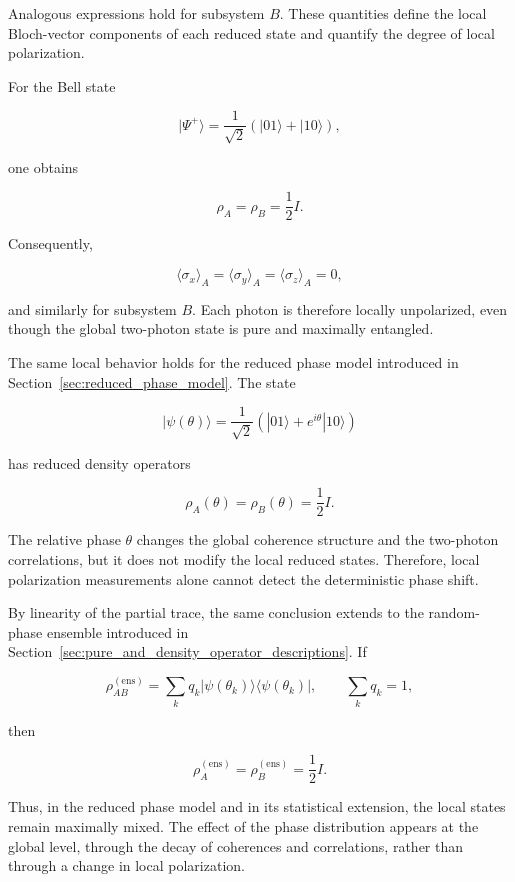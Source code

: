 Analogous expressions hold for subsystem \( B \). These quantities define the local Bloch-vector components of each reduced state and quantify the degree of local polarization.

\medskip

For the Bell state

\[
|\Psi^+\rangle
=
\frac{1}{\sqrt{2}}
\left(
|01\rangle + |10\rangle
\right),
\]

one obtains

\[
\rho_A
=
\rho_B
=
\frac{1}{2}I.
\]

Consequently,

\[
\langle \sigma_x \rangle_A
=
\langle \sigma_y \rangle_A
=
\langle \sigma_z \rangle_A
=
0,
\]

and similarly for subsystem \( B \). Each photon is therefore locally unpolarized, even though the global two-photon state is pure and maximally entangled.

\medskip

The same local behavior holds for the reduced phase model introduced in Section~\ref{sec:reduced_phase_model}. The state

\[
|\psi(\theta)\rangle
=
\frac{1}{\sqrt{2}}
\left(
|01\rangle + e^{i\theta}|10\rangle
\right)
\]

has reduced density operators

\[
\rho_A(\theta)
=
\rho_B(\theta)
=
\frac{1}{2}I.
\]

The relative phase \( \theta \) changes the global coherence structure and the two-photon correlations, but it does not modify the local reduced states. Therefore, local polarization measurements alone cannot detect the deterministic phase shift.

\medskip

By linearity of the partial trace, the same conclusion extends to the random-phase ensemble introduced in Section~\ref{sec:pure_and_density_operator_descriptions}. If

\[
\rho_{AB}^{(\mathrm{ens})}
=
\sum_k q_k
|\psi(\theta_k)\rangle
\langle \psi(\theta_k)|,
\qquad
\sum_k q_k = 1,
\]

then

\[
\rho_A^{(\mathrm{ens})}
=
\rho_B^{(\mathrm{ens})}
=
\frac{1}{2}I.
\]

Thus, in the reduced phase model and in its statistical extension, the local states remain maximally mixed. The effect of the phase distribution appears at the global level, through the decay of coherences and correlations, rather than through a change in local polarization.

